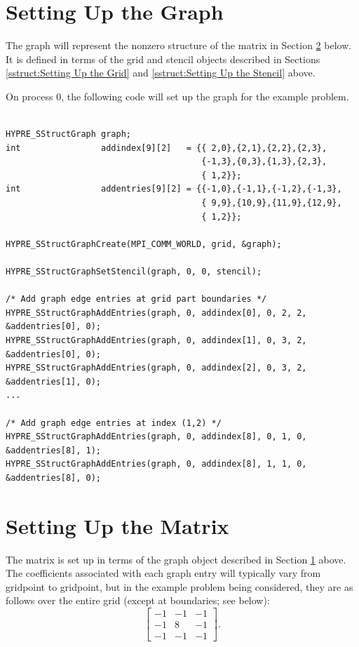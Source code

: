 \section{Setting Up the Graph}
\label{sstruct:Setting Up the Graph}

The graph will represent the nonzero structure of the matrix in
Section \ref{sstruct:Setting Up the Matrix} below.  It is defined in
terms of the grid and stencil objects described in Sections
\ref{sstruct:Setting Up the Grid} and \ref{sstruct:Setting Up the
Stencil} above.

On process 0, the following code will set up the graph for the
example problem.
\begin{display}
\begin{verbatim}

HYPRE_SStructGraph graph;
int                addindex[9][2]   = {{ 2,0},{2,1},{2,2},{2,3},
                                       {-1,3},{0,3},{1,3},{2,3},
                                       { 1,2}};
int                addentries[9][2] = {{-1,0},{-1,1},{-1,2},{-1,3},
                                       { 9,9},{10,9},{11,9},{12,9},
                                       { 1,2}};

HYPRE_SStructGraphCreate(MPI_COMM_WORLD, grid, &graph);

HYPRE_SStructGraphSetStencil(graph, 0, 0, stencil);

/* Add graph edge entries at grid part boundaries */
HYPRE_SStructGraphAddEntries(graph, 0, addindex[0], 0, 2, 2, &addentries[0], 0);
HYPRE_SStructGraphAddEntries(graph, 0, addindex[1], 0, 3, 2, &addentries[0], 0);
HYPRE_SStructGraphAddEntries(graph, 0, addindex[2], 0, 3, 2, &addentries[1], 0);
...

/* Add graph edge entries at index (1,2) */
HYPRE_SStructGraphAddEntries(graph, 0, addindex[8], 0, 1, 0, &addentries[8], 1);
HYPRE_SStructGraphAddEntries(graph, 0, addindex[8], 1, 1, 0, &addentries[8], 0);

\end{verbatim}
\end{display}


\section{Setting Up the Matrix}
\label{sstruct:Setting Up the Matrix}

The matrix is set up in terms of the graph object described in Section
\ref{sstruct:Setting Up the Graph} above.  The coefficients associated
with each graph entry will typically vary from gridpoint to gridpoint,
but in the example problem being considered, they are as follows over
the entire grid (except at boundaries; see below):
\begin{equation}\label{sstruct:eqn-stencil-laplacian}
\left [
\begin{array}{ccc}
 -1 & -1 & -1 \\
 -1 &  8 & -1 \\
 -1 & -1 & -1 
\end{array}
\right ] .
\end{equation}

